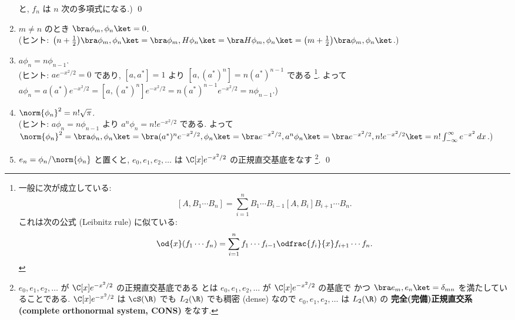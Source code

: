 \documentclass[12pt,twoside]{jarticle}
\begin{document}
\begin{question}[量子調和振動子]
\begin{enumerate}
    と, $f_n$ は $n$ 次の多項式になる.)
    \qed
  \item $m\ne n$ のとき $\bra \phi_m,\phi_n\ket = 0$.
    \\(ヒント: $\bigl(n+\frac{1}{2}\bigr)\bra\phi_m,\phi_n\ket
    = \bra\phi_m,H\phi_n\ket 
    = \bra H\phi_m,\phi_n\ket
    = \bigl(m+\frac{1}{2}\bigr)\bra\phi_m,\phi_n\ket$.)
  \item $a\phi_n = n \phi_{n-1}$.
    \\(ヒント: $a e^{-x^2/2}=0$ であり, 
    $[a,a^*]=1$ より $[a,(a^*)^n]=n (a^*)^{n-1}$ である%
    \footnote{一般に次が成立している: $$[A,B_1\cdots B_n]
      =\sum_{i=1}^n B_1\cdots B_{i-1}[A,B_i]B_{i+1}\cdots B_n.$$
      これは次の公式 (Leibnitz rule) に似ている: $$\od{x}(f_1\cdots f_n)
      =\sum_{i=1}^n f_1\cdots f_{i-1}\odfrac{f_i}{x}f_{i+1}\cdots f_n.$$}. 
    よって $a\phi_n = a(a^*)e^{-x^2/2} = [a,(a^*)^n]e^{-x^2/2} 
    = n(a^*)^{n-1} e^{-x^2/2} = n\phi_{n-1}$.)
  \item $\norm{\phi_n}^2 = n!\sqrt{\pi}$.
    \\(ヒント: $a\phi_n = n\phi_{n-1}$ より $a^n\phi_n = n!e^{-x^2/2}$ である.
    よって $\norm{\phi_n}^2 = \bra\phi_n,\phi_n\ket
    = \bra (a^*)^n e^{-x^2/2},\phi_n\ket
    = \bra e^{-x^2/2},a^n\phi_n\ket
    = \bra e^{-x^2/2},n! e^{-x^2/2}\ket
    = n!\int_{-\infty}^\infty e^{-x^2}\,dx$.)
  \item $e_n = \phi_n/\norm{\phi_n}$ と置くと, $e_0,e_1,e_2,\ldots$ 
    は $\C[x]e^{-x^2/2}$ の正規直交基底をなす%
    \footnote{$e_0,e_1,e_2,\ldots$ が $\C[x]e^{-x^2/2}$ の正規直交基底である
      とは $e_0,e_1,e_2,\ldots$ が $\C[x]e^{-x^2/2}$ の基底で
      かつ $\bra e_m,e_n\ket = \delta_{mn}$ を満たしていることである.
      $\C[x]e^{-x^2/2}$ は $\cS(\R)$ でも $L_2(\R)$ でも稠密 (dense)
      なので $e_0,e_1,e_2,\ldots$ は $L_2(\R)$ の
      {\bf 完全(完備)正規直交系 (complete orthonormal system, CONS)} をなす.}.
    \qed
  \end{enumerate}
\end{question}

\end{document}
